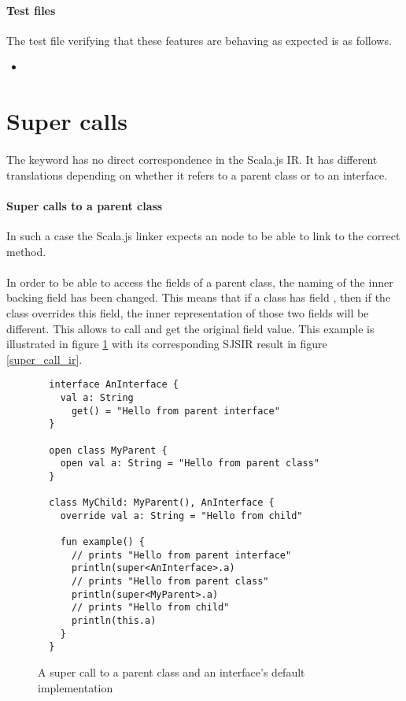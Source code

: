 \paragraph{Test files} The test file verifying that these features are behaving as 
expected is as follows.

\begin{itemize}
 \item {}
\end{itemize}

\section{Super calls} \label{super_calls}

\paragraph{} The  keyword has no direct correspondence in the Scala.js IR. It has 
different translations depending on whether it refers to a parent class or to an interface.

\paragraph{Super calls to a parent class} In such a case the Scala.js linker expects an 
 node to be able to link to the correct method.

\paragraph{} In order to be able to access the fields of a parent class, the naming of the inner 
backing field has been changed. This means that if a class  has field 
, then if the class  overrides this field, the inner 
representation of those two fields will be different. This allows  to call 
 and get the original field value. This example is illustrated in figure 
\ref{super_call_example} with its corresponding SJSIR result in figure \ref{super_call_ir}.

\begin{figure}[h]
 \begin{verbatim}
  interface AnInterface {
    val a: String
      get() = "Hello from parent interface"
  }

  open class MyParent {
    open val a: String = "Hello from parent class"
  }

  class MyChild: MyParent(), AnInterface {
    override val a: String = "Hello from child"

    fun example() {
      // prints "Hello from parent interface"
      println(super<AnInterface>.a) 
      // prints "Hello from parent class"
      println(super<MyParent>.a)
      // prints "Hello from child"
      println(this.a)
    }
  }
 \end{verbatim}
 \caption{A super call to a parent class and an interface's default implementation}
 \label{super_call_example}
\end{figure}

